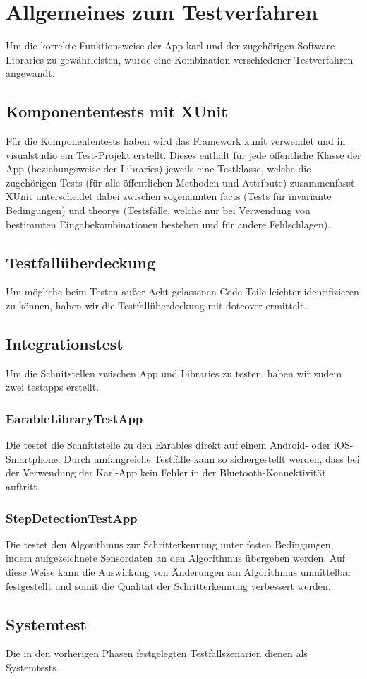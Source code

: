 \documentclass[../validierung.tex]{subfiles}
\begin{document}
\clearpage

\section{Allgemeines zum Testverfahren}
Um die korrekte Funktionsweise der App \Gls{karl} und der zugehörigen Software-Libraries zu gewährleisten,
wurde eine Kombination verschiedener Testverfahren angewandt.

\subsection{Komponententests mit XUnit}
Für die Komponententests haben wird das Framework \Gls{xunit} verwendet und in \gls{visualstudio} ein Test-Projekt erstellt.
Dieses enthält für jede öffentliche Klasse der App (beziehungsweise der Libraries) jeweils eine Testklasse, welche die zugehörigen Tests (für alle öffentlichen Methoden und Attribute) zusammenfasst.
XUnit unterscheidet dabei zwischen sogenannten \Gls{fact}s (Tests für invariante Bedingungen) und \Glspl{theory} (Testsfälle, welche nur bei Verwendung von bestimmten Eingabekombinationen bestehen und für andere Fehlschlagen).

\subsection{Testfallüberdeckung}
Um mögliche beim Testen außer Acht gelassenen Code-Teile leichter identifizieren zu können, haben wir die Testfallüberdeckung mit \gls{dotcover} ermittelt.

\subsection{Integrationstest}
Um die Schnitstellen zwischen App und Libraries zu testen, haben wir zudem zwei \Gls{testapp}s erstellt.

\subsubsection{EarableLibraryTestApp}
Die  testet die Schnittstelle zu den Earables direkt auf einem Android- oder iOS-Smartphone.
Durch umfangreiche Testfälle kann so sichergestellt werden, dass bei der Verwendung der Karl-App kein Fehler in der Bluetooth-Konnektivität auftritt.

\subsubsection{StepDetectionTestApp}
Die  testet den Algorithmus zur Schritterkennung unter festen Bedingungen, indem aufgezeichnete Sensordaten an den Algorithmus übergeben werden.
Auf diese Weise kann die Auswirkung von Änderungen am Algorithmus unmittelbar festgestellt und somit die Qualität der Schritterkennung verbessert werden.

\subsection{Systemtest}
Die in den vorherigen Phasen festgelegten Testfallszenarien dienen als Systemtests.
\end{document}

